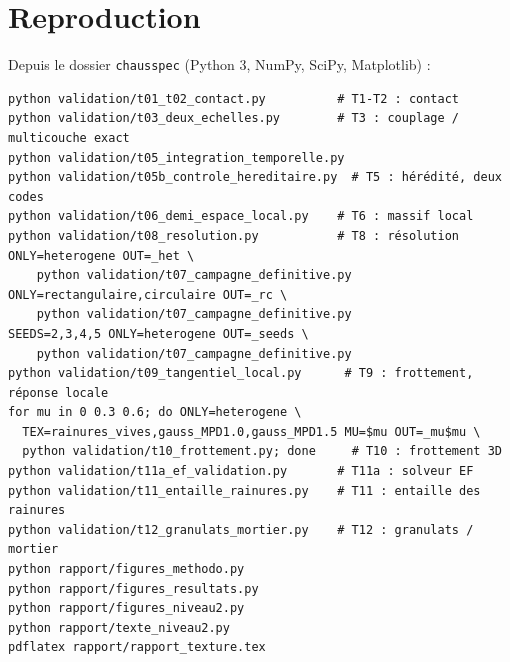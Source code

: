\documentclass[11pt,a4paper]{article}
\begin{document}
\section{Reproduction}\label{ann:repro}
Depuis le dossier \texttt{chausspec} (Python 3, NumPy, SciPy, Matplotlib) :
\begin{verbatim}
python validation/t01_t02_contact.py          # T1-T2 : contact
python validation/t03_deux_echelles.py        # T3 : couplage / multicouche exact
python validation/t05_integration_temporelle.py
python validation/t05b_controle_hereditaire.py  # T5 : hérédité, deux codes
python validation/t06_demi_espace_local.py    # T6 : massif local
python validation/t08_resolution.py           # T8 : résolution
ONLY=heterogene OUT=_het \
    python validation/t07_campagne_definitive.py
ONLY=rectangulaire,circulaire OUT=_rc \
    python validation/t07_campagne_definitive.py
SEEDS=2,3,4,5 ONLY=heterogene OUT=_seeds \
    python validation/t07_campagne_definitive.py
python validation/t09_tangentiel_local.py      # T9 : frottement, réponse locale
for mu in 0 0.3 0.6; do ONLY=heterogene \
  TEX=rainures_vives,gauss_MPD1.0,gauss_MPD1.5 MU=$mu OUT=_mu$mu \
  python validation/t10_frottement.py; done     # T10 : frottement 3D
python validation/t11a_ef_validation.py       # T11a : solveur EF
python validation/t11_entaille_rainures.py    # T11 : entaille des rainures
python validation/t12_granulats_mortier.py    # T12 : granulats / mortier
python rapport/figures_methodo.py
python rapport/figures_resultats.py
python rapport/figures_niveau2.py
python rapport/texte_niveau2.py
pdflatex rapport/rapport_texture.tex
\end{verbatim}
\end{document}
